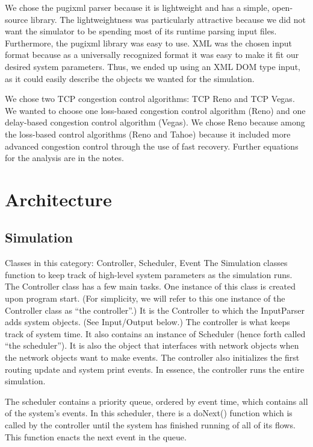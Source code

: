 \documentclass{article}
\begin{document}
    We chose the pugixml parser because it is lightweight and has a simple, open-source library. The lightweightness was particularly attractive because we did not want the simulator to be spending most of its runtime parsing input files. Furthermore, the pugixml library was easy to use. XML was the chosen input format because as a universally recognized format it was easy to make it fit our desired system parameters. Thus, we ended up using an XML DOM type input, as it could easily describe the objects we wanted for the simulation.

    We chose two TCP congestion control algorithms: TCP Reno and TCP Vegas. We wanted to choose one loss-based congestion control algorithm (Reno) and one delay-based congestion control algorithm (Vegas). We chose Reno because among the loss-based control algorithms (Reno and Tahoe) because it included more advanced congestion control through the use of fast recovery. Further equations for the analysis are in the notes.


\section{Architecture}

\subsection{Simulation}
    Classes in this category: Controller, Scheduler, Event
    The Simulation classes function to keep track of high-level system parameters as the simulation runs. 
The Controller class has a few main tasks. One instance of this class is created upon program start. (For simplicity, we will refer to this one instance of the Controller class as “the controller”.) It is the Controller to which the InputParser adds system objects. (See Input/Output below.) The controller is what keeps track of system time. It also contains an instance of Scheduler (hence forth called “the scheduler”). It is also the object that interfaces with network objects when the network objects want to make events. The controller also initializes the first routing update and system print events. In essence, the controller runs the entire simulation.

The scheduler contains a priority queue, ordered by event time, which contains all of the system’s events. In this scheduler, there is a doNext() function which is called by the controller until the system has finished running of all of its flows. This function enacts the next event in the queue. 
\end{document}
